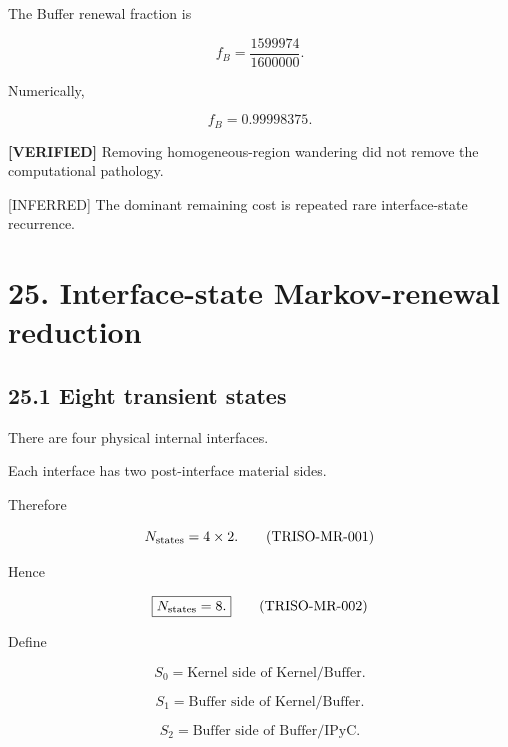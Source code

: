 \documentclass[11pt,a4paper]{article}
\begin{document}
The Buffer renewal fraction is

\begin{equation}
f_B
=
\frac{1599974}{1600000}.
\tag{TRISO-WOS-032}
\label{eq:triso-wos-032}
\end{equation}

Numerically,

\begin{equation}
\boxed{
f_B=0.99998375.
}
\tag{TRISO-WOS-033}
\label{eq:triso-wos-033}
\end{equation}

\textbf{[VERIFIED]} Removing homogeneous-region wandering did not remove the computational pathology.

[INFERRED] The dominant remaining cost is repeated rare interface-state recurrence.

\section*{25. Interface-state Markov-renewal reduction}

\subsection*{25.1 Eight transient states}

There are four physical internal interfaces.

Each interface has two post-interface material sides.

Therefore

\begin{equation}
N_{\rm states}
=
4\times2.
\tag{TRISO-MR-001}
\label{eq:triso-mr-001}
\end{equation}

Hence

\begin{equation}
\boxed{N_{\rm states}=8.}
\tag{TRISO-MR-002}
\label{eq:triso-mr-002}
\end{equation}

Define

\begin{equation}
S_0=\text{Kernel side of Kernel/Buffer}.
\tag{TRISO-MR-003}
\label{eq:triso-mr-003}
\end{equation}

\begin{equation}
S_1=\text{Buffer side of Kernel/Buffer}.
\tag{TRISO-MR-004}
\label{eq:triso-mr-004}
\end{equation}

\begin{equation}
S_2=\text{Buffer side of Buffer/IPyC}.
\tag{TRISO-MR-005}
\label{eq:triso-mr-005}
\end{equation}
\end{document}
